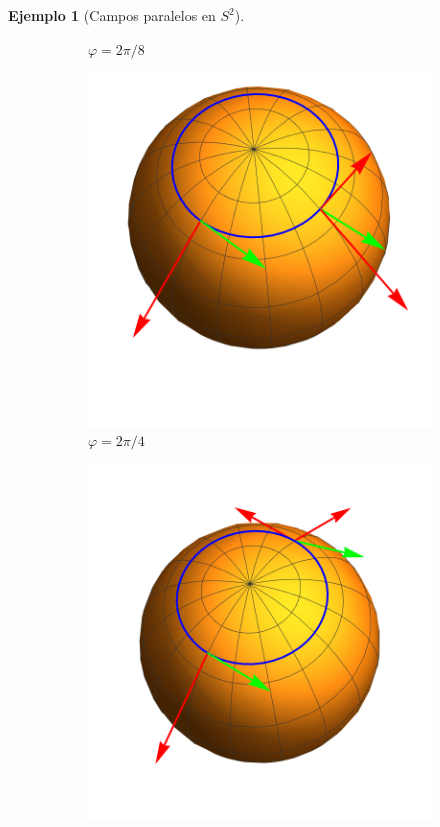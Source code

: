 \documentclass[spanish]{book}
\theoremstyle{definition}
\newtheorem*{ejem}{Ejemplo}
\begin{document}
\begin{ejem}[Campos paralelos en $S^2$]
\begin{figure}[H]
\begin{center}
\begin{subfigure}[t]{0.4\linewidth}
					\caption*{$\varphi=2\pi/8$}
				\end{subfigure}
				\begin{subfigure}[t]{0.4\linewidth}
					\centering
					\includegraphics[width=\linewidth]{fig15c}
					\caption*{$\varphi=2\pi/4$}
				\end{subfigure}
				\begin{subfigure}[t]{0.4\linewidth}
					\centering
					\includegraphics[width=\linewidth]{fig15d}

\end{subfigure}
\end{center}
\end{figure}
\end{ejem}
\end{document}
